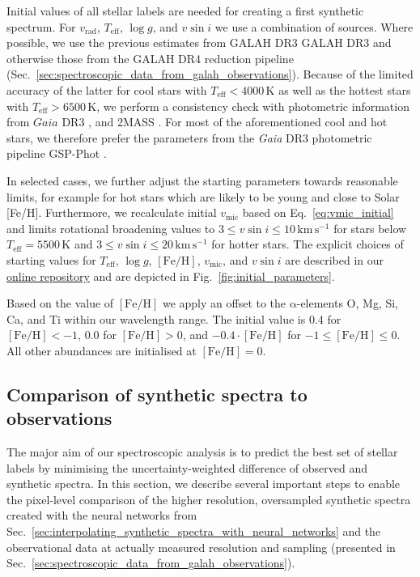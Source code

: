 \documentclass[
  journal=pasa,
  manuscript=research-paper, %
  year=2023,
  volume=37
]{cup-journal}
\newcommand{\Teff}{$T_\mathrm{eff}$\xspace}
\newcommand{\logg}{$\log g$\xspace}
\newcommand{\feh}{$\mathrm{[Fe/H]}$\xspace}
\newcommand{\vmic}{$v_\mathrm{mic}$\xspace}
\newcommand{\vsini}{$v \sin i$\xspace}
\newcommand{\vrad}{$v_\mathrm{rad}$\xspace}
\newcommand{\Gaia}{\textit{Gaia}\xspace}
\begin{document}
Initial values of all stellar labels are needed for creating a first synthetic spectrum. For \vrad, \Teff, \logg, and \vsini we use a combination of sources. Where possible, we use the previous estimates from GALAH DR3 GALAH DR3 \citep{Buder2021} and otherwise those from the GALAH DR4 reduction pipeline (Sec.~\ref{sec:spectroscopic_data_from_galah_observations}). Because of the limited accuracy of the latter for cool stars with $T_\text{eff} < 4000\,\mathrm{K}$ as well as the hottest stars with $T_\text{eff} > 6500\,\mathrm{K}$, we perform a consistency check with photometric information from $\Gaia$ DR3 \citep{Brown2021}, and 2MASS \citep{Skrutskie2006}. For most of the aforementioned cool and hot stars, we therefore prefer the parameters from the \Gaia DR3 photometric pipeline GSP-Phot \citep{Andrae2022,Fouesneau2022}.

In selected cases, we further adjust the starting parameters towards reasonable limits, for example for hot stars which are likely to be young and close to Solar [Fe/H]. Furthermore, we recalculate initial \vmic based on Eq.~\ref{eq:vmic_initial} and limits rotational broadening values to $3 \leq v \sin i \leq 10\,\mathrm{km\,s^{-1}}$ for stars below $T_\text{eff} = 5500\,\mathrm{K}$ and $3 \leq v \sin i \leq 20\,\mathrm{km\,s^{-1}}$ for hotter stars. The explicit choices of starting values for \Teff, \logg, \feh, \vmic, and \vsini are described in our \href{https://github.com/svenbuder/GALAH_DR4/blob/main/spectrum_analysis/galah_dr4_initial_parameters.ipynb}{online repository} and are depicted in Fig.~\ref{fig:initial_parameters}.

Based on the value of \feh we apply an offset to the $\mathrm{\alpha}$-elements O, Mg, Si, Ca, and Ti within our wavelength range. The initial value is 0.4 for $\mathrm{[Fe/H]} < -1$, 0.0 for $\mathrm{[Fe/H]} > 0$, and $-0.4\cdot \mathrm{[Fe/H]}$ for $-1 \leq \mathrm{[Fe/H]} \leq 0$. All other abundances are initialised at $\mathrm{[Fe/H]} = 0$.

\subsection{Comparison of synthetic spectra to observations}
\label{sec:comparison_synthetic_spectra_to_observations}

The major aim of our spectroscopic analysis is to predict the best set of stellar labels by minimising the uncertainty-weighted difference of observed and synthetic spectra. In this section, we describe several important steps to enable the pixel-level comparison of the higher resolution, oversampled synthetic spectra created with the neural networks from Sec.~\ref{sec:interpolating_synthetic_spectra_with_neural_networks} and the observational data at actually measured resolution and sampling (presented in Sec.~\ref{sec:spectroscopic_data_from_galah_observations}).
\end{document}
